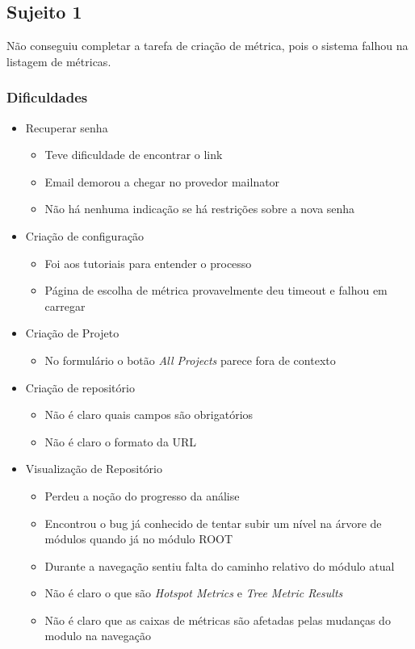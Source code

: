 \subsection{Sujeito 1}
Não conseguiu completar a tarefa de criação de métrica, pois o sistema falhou na listagem de métricas.

  \subsubsection{Dificuldades}
  \begin{itemize}
    \item Recuperar senha
      \begin{itemize}
        \item Teve dificuldade de encontrar o link
        \item Email demorou a chegar no provedor mailnator
        \item Não há nenhuma indicação se há restrições sobre a nova senha
      \end{itemize}
    \item Criação de configuração
      \begin{itemize}
        \item Foi aos tutoriais para entender o processo
        \item Página de escolha de métrica provavelmente deu timeout e falhou em carregar
      \end{itemize}
    \item Criação de Projeto
      \begin{itemize}
        \item No formulário o botão \textit{All Projects} parece fora de contexto
      \end{itemize}
    \item Criação de repositório
      \begin{itemize}
        \item Não é claro quais campos são obrigatórios
        \item Não é claro o formato da URL
      \end{itemize}
    \item Visualização de Repositório
      \begin{itemize}
        \item Perdeu a noção do progresso da análise
        \item Encontrou o bug já conhecido de tentar subir um nível na árvore de módulos quando já no módulo ROOT
        \item Durante a navegação sentiu falta do caminho relativo do módulo atual
        \item Não é claro o que são \textit{Hotspot Metrics} e \textit{Tree Metric Results}
        \item Não é claro que as caixas de métricas são afetadas pelas mudanças do modulo na navegação
      \end{itemize}
  \end{itemize}
